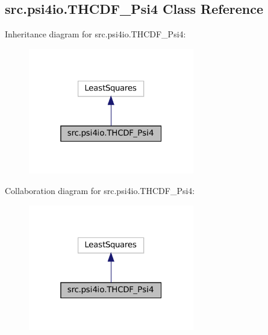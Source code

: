 \hypertarget{classsrc_1_1psi4io_1_1THCDF__Psi4}{}\subsection{src.\+psi4io.\+T\+H\+C\+D\+F\+\_\+\+Psi4 Class Reference}
\label{classsrc_1_1psi4io_1_1THCDF__Psi4}


Inheritance diagram for src.\+psi4io.\+T\+H\+C\+D\+F\+\_\+\+Psi4\+:
\nopagebreak
\begin{figure}[H]
\begin{center}
\leavevmode
\includegraphics[width=205pt]{classsrc_1_1psi4io_1_1THCDF__Psi4__inherit__graph}
\end{center}
\end{figure}


Collaboration diagram for src.\+psi4io.\+T\+H\+C\+D\+F\+\_\+\+Psi4\+:
\nopagebreak
\begin{figure}[H]
\begin{center}
\leavevmode
\includegraphics[width=205pt]{classsrc_1_1psi4io_1_1THCDF__Psi4__coll__graph}
\end{center}
\end{figure}

